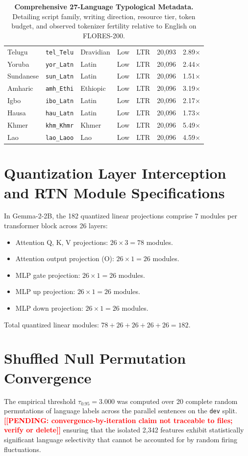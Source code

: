 \documentclass[11pt]{article}
\newcommand{\TODO}[1]{\textbf{\textcolor{red}{[[#1]]}}}
\begin{document}
\begin{table}[t]
\begin{tabularx}{\textwidth}{llllcrr}
Telugu & \texttt{tel\_Telu} & Dravidian & Low & LTR & 20,093 & 2.89$\times$ \\
Yoruba & \texttt{yor\_Latn} & Latin & Low & LTR & 20,096 & 2.44$\times$ \\
Sundanese & \texttt{sun\_Latn} & Latin & Low & LTR & 20,096 & 1.51$\times$ \\
Amharic & \texttt{amh\_Ethi} & Ethiopic & Low & LTR & 20,096 & 3.19$\times$ \\
Igbo & \texttt{ibo\_Latn} & Latin & Low & LTR & 20,096 & 2.17$\times$ \\
Hausa & \texttt{hau\_Latn} & Latin & Low & LTR & 20,096 & 1.73$\times$ \\
Khmer & \texttt{khm\_Khmr} & Khmer & Low & LTR & 20,096 & 5.49$\times$ \\
Lao & \texttt{lao\_Laoo} & Lao & Low & LTR & 20,096 & 4.59$\times$ \\
\bottomrule
\end{tabularx}
\caption{\textbf{Comprehensive 27-Language Typological Metadata.} Detailing script family, writing direction, resource tier, token budget, and observed tokenizer fertility relative to English on FLORES-200.}
\label{tab:full_panel_metadata}
\end{table}

\section{Quantization Layer Interception and RTN Module Specifications}
\label{sec:appendix_rtn}
In Gemma-2-2B, the 182 quantized linear projections comprise 7 modules per transformer block across 26 layers:
\begin{itemize}
    \item Attention Q, K, V projections: $26 \times 3 = 78$ modules.
    \item Attention output projection (O): $26 \times 1 = 26$ modules.
    \item MLP gate projection: $26 \times 1 = 26$ modules.
    \item MLP up projection: $26 \times 1 = 26$ modules.
    \item MLP down projection: $26 \times 1 = 26$ modules.
\end{itemize}
Total quantized linear modules: $78 + 26 + 26 + 26 + 26 = 182$.

\section{Shuffled Null Permutation Convergence}
\label{sec:appendix_null}
The empirical threshold $\tau_{0.95} = 3.000$ was computed over 20 complete random permutations of language labels across the parallel sentences on the \texttt{dev} split. \TODO{PENDING: convergence-by-iteration claim not traceable to files; verify or delete} ensuring that the isolated 2,342 features exhibit statistically significant language selectivity that cannot be accounted for by random firing fluctuations.
\end{document}
